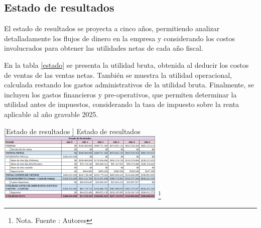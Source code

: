 \subsection{Estado de resultados}

El estado de resultados se proyecta a cinco años, permitiendo analizar detalladamente los flujos de dinero en la empresa y considerando los costos involucrados para obtener las utilidades netas de cada año fiscal.

En la tabla \ref{estado} se presenta la utilidad bruta, obtenida al deducir los costos de ventas de las ventas netas. También se muestra la utilidad operacional, calculada restando los gastos administrativos de la utilidad bruta. Finalmente, se incluyen los gastos financieros y pre-operativos, que permiten determinar la utilidad antes de impuestos, considerando la tasa de impuesto sobre la renta aplicable al año gravable 2025.

\vspace{2mm}
\begin{minipage}{0.9\textwidth}
\centering
{}[{Estado de resultados }]{ Estado de resultados }
\label{estado}
\includegraphics[width=0.6\textwidth]{Content/Images/AF/EstadoDeResultados.png}
\footnote{Nota. \textup{Fuente : Autores}}
\end{minipage}
\newpage